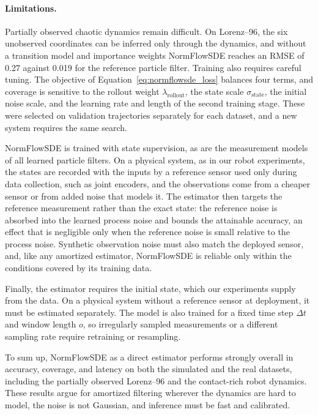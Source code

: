 \paragraph{Limitations.}
Partially observed chaotic dynamics remain difficult. On Lorenz--96, the six unobserved coordinates can be inferred only through the dynamics, and without a transition model and importance weights NormFlowSDE reaches an RMSE of 0.27 against 0.019 for the reference particle filter. Training also requires careful tuning. The objective of Equation~\eqref{eq:normflowsde_loss} balances four terms, and coverage is sensitive to the rollout weight $\lambda_{\mathrm{rollout}}$, the state scale $\sigma_{\mathrm{state}}$, the initial noise scale, and the learning rate and length of the second training stage. These were selected on validation trajectories separately for each dataset, and a new system requires the same search.

NormFlowSDE is trained with state supervision, as are the measurement models of all learned particle filters. On a physical system, as in our robot experiments, the states are recorded with the inputs by a reference sensor used only during data collection, such as joint encoders, and the observations come from a cheaper sensor or from added noise that models it. The estimator then targets the reference measurement rather than the exact state: the reference noise is absorbed into the learned process noise and bounds the attainable accuracy, an effect that is negligible only when the reference noise is small relative to the process noise. Synthetic observation noise must also match the deployed sensor, and, like any amortized estimator, NormFlowSDE is reliable only within the conditions covered by its training data.

Finally, the estimator requires the initial state, which our experiments supply from the data. On a physical system without a reference sensor at deployment, it must be estimated separately. The model is also trained for a fixed time step $\Delta t$ and window length $o$, so irregularly sampled measurements or a different sampling rate require retraining or resampling.

To sum up, NormFlowSDE as a direct estimator performs strongly overall in accuracy, coverage, and latency on both the simulated and the real datasets, including the partially observed Lorenz--96 and the contact-rich robot dynamics. These results argue for amortized filtering wherever the dynamics are hard to model, the noise is not Gaussian, and inference must be fast and calibrated.